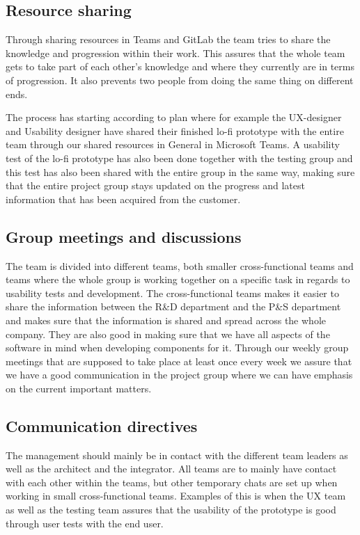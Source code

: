 \documentclass[12pt]{article}
\begin{document}
    \subsection{Resource sharing}
 Through sharing resources in Teams and GitLab the team tries to share the knowledge and progression within their work. This assures that the whole team gets to take part of each other’s knowledge and where they currently are in terms of progression. It also prevents two people from doing the same thing on different ends. 
 
 The process has starting according to plan where for example the UX-designer and Usability designer have shared their finished lo-fi prototype with the entire team through our shared resources in General in Microsoft Teams. A usability test of the lo-fi prototype has also been done together with the testing group and this test has also been shared with the entire group in the same way, making sure that the entire project group stays updated on the progress and latest information that has been acquired from the customer. 
 
    \subsection{Group meetings and discussions}
The team is divided into different teams, both smaller cross-functional teams and teams where the whole group is working together on a specific task in regards to usability tests and development. The cross-functional teams makes it easier to share the information between the R\&D department and the P\&S department and makes sure that the information is shared and spread across the whole company. They are also good in making sure that we have all aspects of the software in mind when developing components for it. Through our weekly group meetings that are supposed to take place at least once every week we assure that we have a good communication in the project group where we can have emphasis on the current important matters.

    \subsection{Communication directives}


The management should mainly be in contact with the different team leaders as well as the architect and the integrator. All teams are to mainly have contact with each other within the teams, but other temporary chats are set up when working in small cross-functional teams. Examples of this is when the UX team as well as the testing team assures that the usability of the prototype is good through user tests with the end user. 
\end{document}
